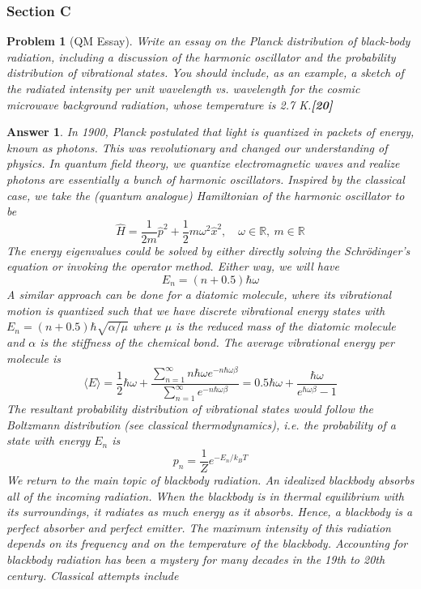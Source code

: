 \documentclass[a4paper]{article}
\newtheorem{ans}{Answer}[subsection]
\theoremstyle{new}
\newtheorem{qns}{Problem}[subsection]
\begin{document}
\subsubsection{Section C}
\begin{qns}[QM Essay]
Write an essay on the Planck distribution of black-body radiation, including a discussion of the harmonic oscillator and the probability distribution of vibrational states. You should include, as an example, a sketch of the radiated intensity per unit wavelength vs. wavelength for the cosmic microwave background radiation, whose temperature is 2.7 K.\hfill\textbf{[20]}
\end{qns}
\begin{ans}
In 1900, Planck postulated that light is quantized in packets of energy, known as photons. This was revolutionary and changed our understanding of physics. In quantum field theory, we quantize electromagnetic waves and realize photons are essentially a bunch of harmonic oscillators. Inspired by the classical case, we take the (quantum analogue) Hamiltonian of the harmonic oscillator to be
$$\hat{H}=\frac{1}{2m}\hat{p}^2+\frac{1}{2}m\omega^2\hat{x}^2,\quad \omega\in\mathbb{R},~m\in\mathbb{R}$$
The energy eigenvalues could be solved by either directly solving the Schr\"{o}dinger's equation or invoking the operator method. Either way, we will have
$$E_n=(n+0.5)\hbar\omega$$
A similar approach can be done for a diatomic molecule, where its vibrational motion is quantized such that we have discrete vibrational energy states with $E_n=(n+0.5)\hbar\sqrt{\alpha/\mu}$ where $\mu$ is the reduced mass of the diatomic molecule and $\alpha$ is the stiffness of the chemical bond. The average vibrational energy per molecule is
$$\langle E\rangle=\frac{1}{2}\hbar\omega+\frac{\sum_{n=1}^\infty n\hbar\omega e^{-n\hbar\omega\beta}}{\sum_{n=1}^\infty e^{-n\hbar\omega\beta}}=0.5\hbar\omega+\frac{\hbar\omega}{e^{\hbar\omega\beta}-1}$$
The resultant probability distribution of vibrational states would follow the Boltzmann distribution (see classical thermodynamics), i.e. the probability of a state with energy $E_n$ is
$$p_n=\frac{1}{Z}e^{-E_n/k_BT}$$
We return to the main topic of blackbody radiation. An idealized blackbody absorbs all of the incoming radiation. When the blackbody is in thermal equilibrium with its surroundings, it radiates as much energy as it absorbs. Hence, a blackbody is a perfect absorber and perfect emitter. The maximum intensity of this radiation depends on its frequency and on the temperature of the blackbody. Accounting for blackbody radiation has been a mystery for many decades in the 19th to 20th century. Classical attempts include

\end{ans}
\end{document}

